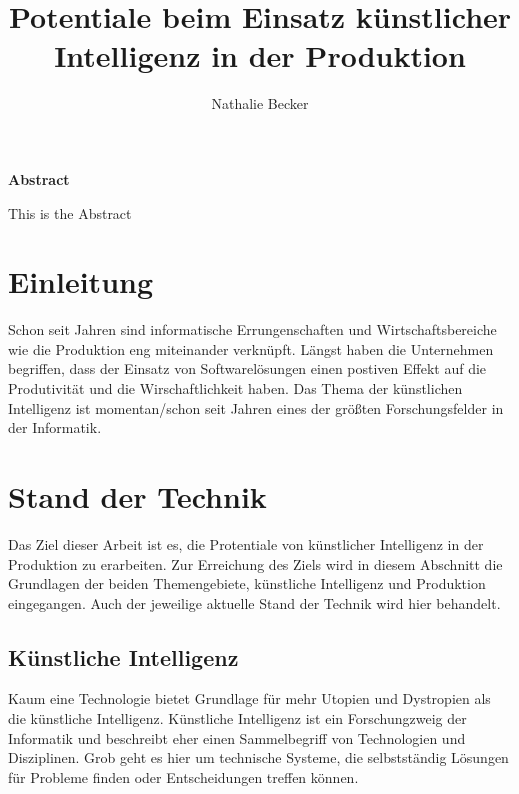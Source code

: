 \documentclass[a4paper,12pt, german]{report}
\begin{document}
\title{Potentiale beim Einsatz künstlicher Intelligenz in der Produktion}
\author{Nathalie Becker}


\begin{titlepage}
\maketitle
\end{titlepage}


\begin{center}
\textbf{Abstract}
\end{center}
This is the Abstract


\tableofcontents
\printacronyms

\chapter{Einleitung}

Schon seit Jahren sind informatische Errungenschaften und Wirtschaftsbereiche wie die Produktion eng miteinander verknüpft. Längst haben die Unternehmen begriffen, dass der Einsatz von Softwarelösungen einen postiven Effekt auf die Produtivität und die Wirschaftlichkeit haben.
Das Thema der künstlichen Intelligenz ist momentan/schon seit Jahren eines der größten Forschungsfelder in der Informatik. 


\chapter{Stand der Technik}

Das Ziel dieser Arbeit ist es, die Protentiale von künstlicher Intelligenz in der Produktion zu erarbeiten. Zur Erreichung des Ziels wird in diesem Abschnitt die Grundlagen der beiden Themengebiete, künstliche Intelligenz und Produktion eingegangen. Auch der jeweilige aktuelle Stand der Technik wird hier behandelt.

\section{Künstliche Intelligenz}

Kaum eine Technologie bietet Grundlage für mehr Utopien und Dystropien als die künstliche Intelligenz. 
Künstliche Intelligenz ist ein Forschungzweig der Informatik und beschreibt eher einen Sammelbegriff von Technologien und Disziplinen. Grob geht es hier um technische Systeme, die selbstständig Lösungen für Probleme finden oder Entscheidungen treffen können. \cite{01} %
\end{document}
